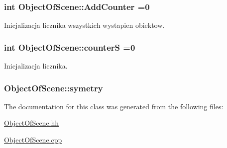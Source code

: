 \subsubsection[{\texorpdfstring{Add\+Counter}{AddCounter}}]{\setlength{\rightskip}{0pt plus 5cm}int Object\+Of\+Scene\+::\+Add\+Counter =0\hspace{0.3cm}{\ttfamily [static]}}\hypertarget{class_object_of_scene_a4f29f829eca02965019b1d0bc28f3af1}{}\label{class_object_of_scene_a4f29f829eca02965019b1d0bc28f3af1}
Inicjalizacja licznika wszystkich wystapien obiektow. 
\subsubsection[{\texorpdfstring{counterS}{counterS}}]{\setlength{\rightskip}{0pt plus 5cm}int Object\+Of\+Scene\+::counterS =0\hspace{0.3cm}{\ttfamily [static]}}\hypertarget{class_object_of_scene_ae1b26e0c68453235a991601aa8f8c8e5}{}\label{class_object_of_scene_ae1b26e0c68453235a991601aa8f8c8e5}
Inicjalizacja licznika. 
\subsubsection[{\texorpdfstring{symetry}{symetry}}]{ Object\+Of\+Scene\+::symetry\hspace{0.3cm}{\ttfamily [protected]}}\hypertarget{class_object_of_scene_a3940aba3014aefed326cdc4301333af1}{}\label{class_object_of_scene_a3940aba3014aefed326cdc4301333af1}


The documentation for this class was generated from the following files\+:\begin{DoxyCompactItemize}
\item 
\hyperlink{_object_of_scene_8hh}{Object\+Of\+Scene.\+hh}\item 
\hyperlink{_object_of_scene_8cpp}{Object\+Of\+Scene.\+cpp}\end{DoxyCompactItemize}

